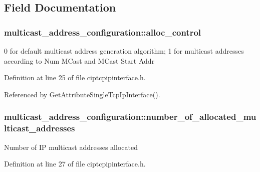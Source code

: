 \subsection{\-Field \-Documentation}
\hypertarget{structmulticast__address__configuration_a3951d5c3e578a8aa1774ce6016ffb056}{
\subsubsection[{alloc\-\_\-control}]{ {\bf multicast\-\_\-address\-\_\-configuration\-::alloc\-\_\-control}}}\label{db/dd7/structmulticast__address__configuration_a3951d5c3e578a8aa1774ce6016ffb056}
0 for default multicast address generation algorithm; 1 for multicast addresses according to \-Num \-M\-Cast and \-M\-Cast \-Start \-Addr 

\-Definition at line 25 of file ciptcpipinterface.\-h.



\-Referenced by \-Get\-Attribute\-Single\-Tcp\-Ip\-Interface().

\hypertarget{structmulticast__address__configuration_a5cb7bf407b6ef9b27e2b033ec7ed1d5c}{
\subsubsection[{number\-\_\-of\-\_\-allocated\-\_\-multicast\-\_\-addresses}]{ {\bf multicast\-\_\-address\-\_\-configuration\-::number\-\_\-of\-\_\-allocated\-\_\-multicast\-\_\-addresses}}}\label{db/dd7/structmulticast__address__configuration_a5cb7bf407b6ef9b27e2b033ec7ed1d5c}
\-Number of \-I\-P multicast addresses allocated 

\-Definition at line 27 of file ciptcpipinterface.\-h.



